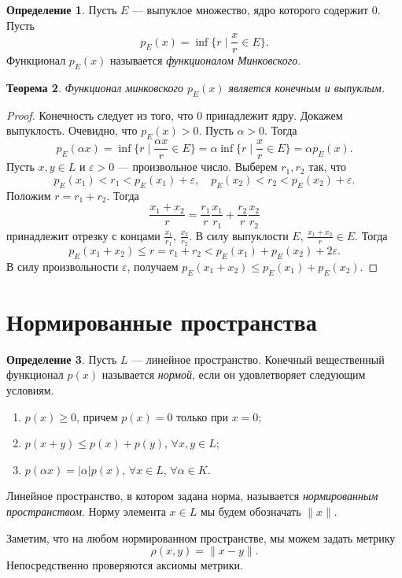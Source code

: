 \documentclass[12pt, titlepage, oneside]{amsbook}
\newtheorem{theorem}{Теорема}[chapter]
\theoremstyle{definition}
\newtheorem{definition}[theorem]{Определение}
\theoremstyle{remark}
\begin{document}
\begin{definition}
	Пусть $E$ --- выпуклое множество, ядро которого содержит $0$. Пусть $$p_E(x)=\inf\{r\mid\frac{x}{r}\in E\}.$$ Функционал $p_E(x)$ называется \emph{функционалом Минковского}.
\end{definition}

\begin{theorem}
	\label{Vyp3}
	Функционал минковского $p_E(x)$ является конечным и выпуклым.
\end{theorem}

\begin{proof}
	Конечность следует из того, что $0$ принадлежит ядру. Докажем выпуклость. Очевидно, что $p_E(x)>0$. Пусть $\alpha>0$. Тогда $$p_E(\alpha x)=\inf\{r\mid\frac{\alpha x}{r}\in E\}=\alpha\inf\{r\mid\frac{x}{r}\in E\}=\alpha p_E(x).$$ Пусть $x,y\in L$ и $\varepsilon>0$ --- произвольное число. Выберем $r_1,r_2$ так, что $$p_E(x_1)<r_1<p_E(x_1)+\varepsilon,\quad p_E(x_2)<r_2<p_E(x_2)+\varepsilon.$$ Положим $r=r_1+r_2$. Тогда $$\frac{x_1+x_2}{r}=\frac{r_1}{r}\frac{x_1}{r_1}+\frac{r_2}{r}\frac{x_2}{r_2}$$ принадлежит отрезку с концами $\frac{x_1}{r_1}$, $\frac{x_2}{r_2}$. В силу выпуклости $E$, $\frac{x_1+x_2}{r}\in E$. Тогда $$p_E(x_1+x_2)\leq r=r_1+r_2<p_E(x_1)+p_E(x_2)+2\varepsilon.$$ В силу произвольности $\varepsilon$, получаем $p_E(x_1+x_2)\leq p_E(x_1)+p_E(x_2)$.
\end{proof}

\section{Нормированные пространства}

\begin{definition}
	Пусть $L$ --- линейное пространство. Конечный вещественный функционал $p(x)$ называется \emph{нормой}, если он удовлетворяет следующим условиям.
	\begin{enumerate}
		\item $p(x)\geq 0$, причем $p(x)=0$ только при $x=0$;
		\item $p(x+y)\leq p(x)+p(y)$, $\forall x,y\in L$;
		\item $p(\alpha x)=|\alpha| p(x)$, $\forall x\in L$, $\forall \alpha\in K$.
	\end{enumerate}
	Линейное пространство, в котором задана норма, называется \emph{нормированным пространством}. Норму элемента $x\in L$ мы будем обозначать $\|x\|$.
\end{definition}

Заметим, что на любом нормированном пространстве, мы можем задать метрику $$\rho(x,y)=\|x-y\|.$$  Непосредственно проверяются аксиомы метрики.
\end{document}
